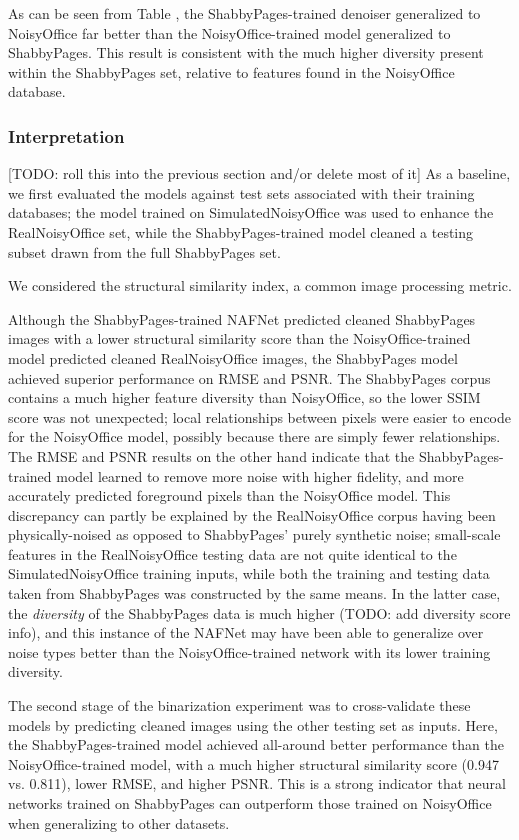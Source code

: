 \documentclass[runningheads]{llncs}
\begin{document}
As can be seen from Table \cite{tab:denoising_results}, the ShabbyPages-trained denoiser generalized to NoisyOffice far better than the NoisyOffice-trained model generalized to ShabbyPages. This result is consistent with the much higher diversity present within the ShabbyPages set, relative to features found in the NoisyOffice database.

\subsubsection{Interpretation} [TODO: roll this into the previous section and/or delete most of it]
As a baseline, we first evaluated the models against test sets associated with their training databases; the model trained on SimulatedNoisyOffice was used to enhance the RealNoisyOffice set, while the ShabbyPages-trained model cleaned a testing subset drawn from the full ShabbyPages set.

We considered the structural similarity index, a common image processing metric.

Although the ShabbyPages-trained NAFNet predicted cleaned ShabbyPages images with a lower structural similarity score than the NoisyOffice-trained model predicted cleaned RealNoisyOffice images, the ShabbyPages model achieved superior performance on RMSE and PSNR.
The ShabbyPages corpus contains a much higher feature diversity than NoisyOffice, so the lower SSIM score was not unexpected; local relationships between pixels were easier to encode for the NoisyOffice model, possibly because there are simply fewer relationships.
The RMSE and PSNR results on the other hand indicate that the ShabbyPages-trained model learned to remove more noise with higher fidelity, and more accurately predicted foreground pixels than the NoisyOffice model.
This discrepancy can partly be explained by the RealNoisyOffice corpus having been physically-noised as opposed to ShabbyPages' purely synthetic noise; small-scale features in the RealNoisyOffice testing data are not quite identical to the SimulatedNoisyOffice training inputs, while both the training and testing data taken from ShabbyPages was constructed by the same means.
In the latter case, the \textit{diversity} of the ShabbyPages data is much higher (TODO: add diversity score info), and this instance of the NAFNet may have been able to generalize over noise types better than the NoisyOffice-trained network with its lower training diversity.

The second stage of the binarization experiment was to cross-validate these models by predicting cleaned images using the other testing set as inputs.
Here, the ShabbyPages-trained model achieved all-around better performance than the NoisyOffice-trained model, with a much higher structural similarity score (0.947 vs. 0.811), lower RMSE, and higher PSNR.
This is a strong indicator that neural networks trained on ShabbyPages can outperform those trained on NoisyOffice when generalizing to other datasets.
\end{document}
